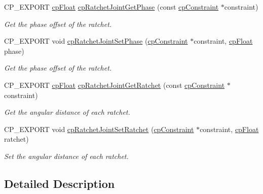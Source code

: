 \begin{DoxyCompactItemize}
C\+P\+\_\+\+E\+X\+P\+O\+RT \mbox{\hyperlink{group__basic_types_gac1ed65573e035bf892505768c852d8d3}{cp\+Float}} \mbox{\hyperlink{group__cp_ratchet_joint_ga7375d4a050643c7ae9c33425ccd5e88c}{cp\+Ratchet\+Joint\+Get\+Phase}} (const \mbox{\hyperlink{structcp_constraint}{cp\+Constraint}} $\ast$constraint)
\begin{DoxyCompactList}\small\item\em Get the phase offset of the ratchet. \end{DoxyCompactList}\item 
\mbox{\label{group__cp_ratchet_joint_ga19d03c89211a4fb3497e1858fa4cc710}} 
C\+P\+\_\+\+E\+X\+P\+O\+RT void \mbox{\hyperlink{group__cp_ratchet_joint_ga19d03c89211a4fb3497e1858fa4cc710}{cp\+Ratchet\+Joint\+Set\+Phase}} (\mbox{\hyperlink{structcp_constraint}{cp\+Constraint}} $\ast$constraint, \mbox{\hyperlink{group__basic_types_gac1ed65573e035bf892505768c852d8d3}{cp\+Float}} phase)
\begin{DoxyCompactList}\small\item\em Get the phase offset of the ratchet. \end{DoxyCompactList}\item 
\mbox{\label{group__cp_ratchet_joint_ga1b085cf204fe62ce3f75fef90dec7152}} 
C\+P\+\_\+\+E\+X\+P\+O\+RT \mbox{\hyperlink{group__basic_types_gac1ed65573e035bf892505768c852d8d3}{cp\+Float}} \mbox{\hyperlink{group__cp_ratchet_joint_ga1b085cf204fe62ce3f75fef90dec7152}{cp\+Ratchet\+Joint\+Get\+Ratchet}} (const \mbox{\hyperlink{structcp_constraint}{cp\+Constraint}} $\ast$constraint)
\begin{DoxyCompactList}\small\item\em Get the angular distance of each ratchet. \end{DoxyCompactList}\item 
\mbox{\label{group__cp_ratchet_joint_ga42f49bb4793fd51c9673cfa11bdb4a33}} 
C\+P\+\_\+\+E\+X\+P\+O\+RT void \mbox{\hyperlink{group__cp_ratchet_joint_ga42f49bb4793fd51c9673cfa11bdb4a33}{cp\+Ratchet\+Joint\+Set\+Ratchet}} (\mbox{\hyperlink{structcp_constraint}{cp\+Constraint}} $\ast$constraint, \mbox{\hyperlink{group__basic_types_gac1ed65573e035bf892505768c852d8d3}{cp\+Float}} ratchet)
\begin{DoxyCompactList}\small\item\em Set the angular distance of each ratchet. \end{DoxyCompactList}\end{DoxyCompactItemize}


\subsection{Detailed Description}
